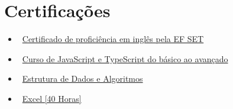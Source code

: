\documentclass[letterpaper,10pt]{article}
\newcommand{\resumeItem}[1]{\item\small{#1}}
\newcommand{\resumeSubHeadingList}{\begin{itemize}[leftmargin=0.15in, label={}]}
\newcommand{\resumeSubHeadingListEnd}{\end{itemize}}
\begin{document}
\section{Certificações}
\resumeSubHeadingList
    \resumeItem{\textbullet\ \normalsize{\href{https://cert.efset.org/KdGLiQ}{Certificado de proficiência em inglês pela EF SET}}}
    \resumeItem{\textbullet\ \normalsize{\href{https://udemy-certificate.s3.amazonaws.com/image/UC-6fc7d4af-701d-446a-b69b-8e167018a749.jpg?v=1706800581000}{Curso de JavaScript e TypeScript do básico ao avançado}}}
    \resumeItem{\textbullet\ \normalsize{\href{https://udemy-certificate.s3.amazonaws.com/image/UC-7074fe91-0541-4bfd-bc58-af41912a6361.jpg?v=1703254492000}{Estrutura de Dados e Algoritmos}}}
    \resumeItem{\textbullet\ \normalsize{\href{https://www.cursoemvideo.com/validacao-de-certificado/?codigo=798CE-654D-9}{Excel [40 Horas]}}}
\resumeSubHeadingListEnd
\end{document}
